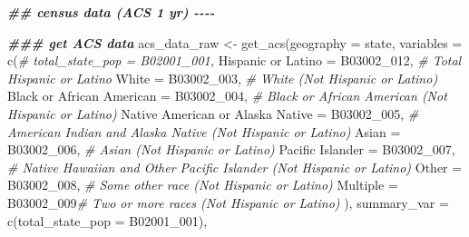 \documentclass[
]{article}
\newenvironment{Shaded}{\begin{snugshade}}{\end{snugshade}}
\newcommand{\AttributeTok}[1]{\textcolor[rgb]{0.77,0.63,0.00}{#1}}
\newcommand{\CommentTok}[1]{\textcolor[rgb]{0.56,0.35,0.01}{\textit{#1}}}
\newcommand{\DocumentationTok}[1]{\textcolor[rgb]{0.56,0.35,0.01}{\textbf{\textit{#1}}}}
\newcommand{\FunctionTok}[1]{\textcolor[rgb]{0.00,0.00,0.00}{#1}}
\newcommand{\NormalTok}[1]{#1}
\newcommand{\OtherTok}[1]{\textcolor[rgb]{0.56,0.35,0.01}{#1}}
\newcommand{\StringTok}[1]{\textcolor[rgb]{0.31,0.60,0.02}{#1}}
\begin{document}
\begin{Shaded}
\begin{Highlighting}[]
\DocumentationTok{\#\# census data (ACS 1 yr) {-}{-}{-}{-}}

\DocumentationTok{\#\#\# get ACS data}
\NormalTok{acs\_data\_raw }\OtherTok{\textless{}{-}} \FunctionTok{get\_acs}\NormalTok{(}\AttributeTok{geography =} \StringTok{\textquotesingle{}state\textquotesingle{}}\NormalTok{, }
                        \AttributeTok{variables =} \FunctionTok{c}\NormalTok{(}\CommentTok{\# total\_state\_pop = \textquotesingle{}B02001\_001\textquotesingle{},}
                            \StringTok{\textquotesingle{}Hispanic or Latino\textquotesingle{}} \OtherTok{=} \StringTok{\textquotesingle{}B03002\_012\textquotesingle{}}\NormalTok{, }\CommentTok{\# Total Hispanic or Latino}
                            \StringTok{\textquotesingle{}White\textquotesingle{}} \OtherTok{=} \StringTok{\textquotesingle{}B03002\_003\textquotesingle{}}\NormalTok{, }\CommentTok{\# White (Not Hispanic or Latino)}
                            \StringTok{\textquotesingle{}Black or African American\textquotesingle{}} \OtherTok{=} \StringTok{\textquotesingle{}B03002\_004\textquotesingle{}}\NormalTok{, }\CommentTok{\# Black or African American (Not Hispanic or Latino)}
                            \StringTok{\textquotesingle{}Native American or Alaska Native\textquotesingle{}} \OtherTok{=} \StringTok{\textquotesingle{}B03002\_005\textquotesingle{}}\NormalTok{, }\CommentTok{\# American Indian and Alaska Native (Not Hispanic or Latino)}
                            \StringTok{\textquotesingle{}Asian\textquotesingle{}} \OtherTok{=} \StringTok{\textquotesingle{}B03002\_006\textquotesingle{}}\NormalTok{, }\CommentTok{\# Asian (Not Hispanic or Latino)}
                            \StringTok{\textquotesingle{}Pacific Islander\textquotesingle{}} \OtherTok{=} \StringTok{\textquotesingle{}B03002\_007\textquotesingle{}}\NormalTok{, }\CommentTok{\# Native Hawaiian and Other Pacific Islander (Not Hispanic or Latino)}
                            \StringTok{\textquotesingle{}Other\textquotesingle{}} \OtherTok{=} \StringTok{\textquotesingle{}B03002\_008\textquotesingle{}}\NormalTok{, }\CommentTok{\# Some other race (Not Hispanic or Latino)}
                            \StringTok{\textquotesingle{}Multiple\textquotesingle{}} \OtherTok{=} \StringTok{\textquotesingle{}B03002\_009\textquotesingle{}}\CommentTok{\# Two or more races (Not Hispanic or Latino)}
\NormalTok{                        ),}
                        \AttributeTok{summary\_var =} \FunctionTok{c}\NormalTok{(}\AttributeTok{total\_state\_pop =} \StringTok{\textquotesingle{}B02001\_001\textquotesingle{}}\NormalTok{), }

\end{Highlighting}
\end{Shaded}
\end{document}
